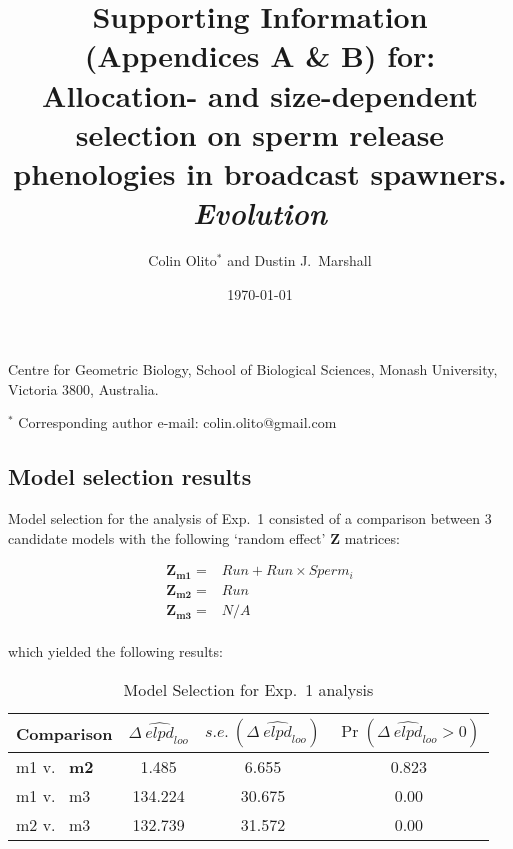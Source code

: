 \documentclass{article}
\title{Supporting Information (Appendices A \& B) for: Allocation- and size-dependent selection on sperm release phenologies in broadcast spawners. \textit{Evolution}}
\author{Colin Olito$^{\ast}$ and Dustin J.~Marshall}
\date{\today}
\begin{document}
\maketitle

\noindent{} Centre for Geometric Biology, School of Biological Sciences, Monash University, Victoria 3800, Australia.
\bigskip

\noindent{} $^\ast$ Corresponding author e-mail: colin.olito@gmail.com
\bigskip

\newpage




\subsection*{Model selection results}
\renewcommand{\theequation}{S\arabic{equation}}
\setcounter{equation}{0}
\renewcommand{\thefigure}{S\arabic{figure}}
\setcounter{figure}{0}
\renewcommand{\thetable}{S\arabic{table}}
\setcounter{table}{0}


Model selection for the analysis of Exp.~1 consisted of a comparison between 3 candidate models with the following `random effect' $\mathbf{Z}$ matrices:

\begin{align*}
	\mathbf{Z_{m1}} = &Run + Run \times Sperm_i \\
	\mathbf{Z_{m2}} = &Run \\
	\mathbf{Z_{m3}} = &N/A \\
\end{align*}

\noindent{} which yielded the following results: 

\begin{table}[!ht]
\caption{Model Selection for Exp.~1 analysis}
\label{Table:Exp1ModComp}
\centering
\begin{tabular}{l c c c } \hline
Comparison & $\Delta~\widehat{\textit{elpd}}_{\textit{loo}}$ & $s.e.~(\Delta~\widehat{\textit{elpd}}_{\textit{loo}})$ & $\Pr(\Delta~\widehat{\textit{elpd}}_{\textit{loo}} > 0)$ \\
\hline
m1 v.~ \textbf{m2} & 1.485   & 6.655  & 0.823 \\
m1 v.~ m3 & 134.224 & 30.675 & 0.00  \\
m2 v.~ m3 & 132.739 & 31.572 & 0.00  \\
\hline
\end{tabular}
\bigskip{}
\end{table}
\end{document}
